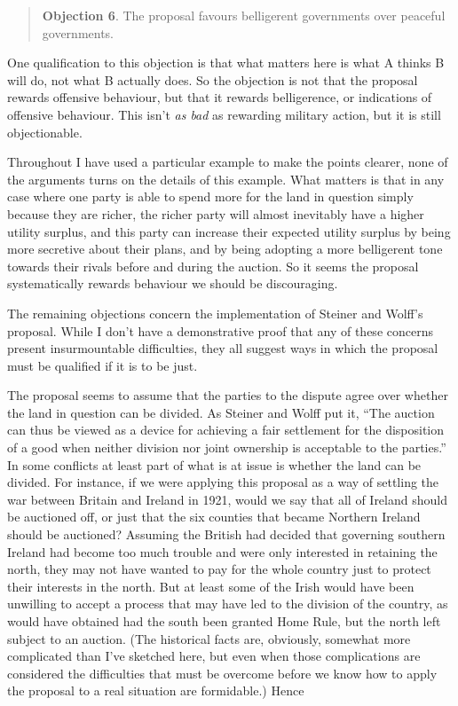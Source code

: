 \begin{quote}
\textbf{Objection 6}. The proposal favours belligerent governments over peaceful governments.
\end{quote}

\noindent One qualification to this objection is that what matters here is what A thinks B will do, not what B actually does. So the objection is not that the proposal rewards offensive behaviour, but that it rewards belligerence, or indications of offensive behaviour. This isn't \textit{as bad} as rewarding military action, but it is still objectionable.

Throughout I have used a particular example to make the points clearer, none of the arguments turns on the details of this example. What matters is that in any case where one party is able to spend more for the land in question simply because they are richer, the richer party will almost inevitably have a higher utility surplus, and this party can increase their expected utility surplus by being more secretive about their plans, and by being adopting a more belligerent tone towards their rivals before and during the auction. So it seems the proposal systematically rewards behaviour we should be discouraging.

The remaining objections concern the implementation of Steiner and Wolff's proposal. While I don't have a demonstrative proof that any of these concerns present insurmountable difficulties, they all suggest ways in which the proposal must be qualified if it is to be just.

The proposal seems to assume that the parties to the dispute agree over whether the land in question can be divided. As Steiner and Wolff put it, ``The auction can thus be viewed as a device for achieving a fair settlement for the disposition of a good when neither division nor joint ownership is acceptable to the parties.'' In some conflicts at least part of what is at issue is whether the land can be divided. For instance, if we were applying this proposal as a way of settling the war between Britain and Ireland in 1921, would we say that all of Ireland should be auctioned off, or just that the six counties that became Northern Ireland should be auctioned? Assuming the British had decided that governing southern Ireland had become too much trouble and were only interested in retaining the north, they may not have wanted to pay for the whole country just to protect their interests in the north. But at least some of the Irish would have been unwilling to accept a process that may have led to the division of the country, as would have obtained had the south been granted Home Rule, but the north left subject to an auction. (The historical facts are, obviously, somewhat more complicated than I've sketched here, but even when those complications are considered the difficulties that must be overcome before we know how to apply the proposal to a real situation are formidable.) Hence

